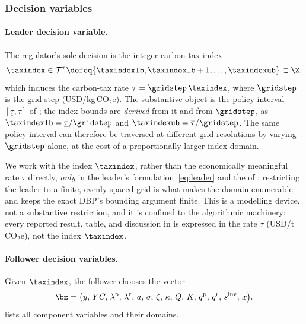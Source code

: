 \subsubsection{Decision variables}
\label{sec:model:variables}

\paragraph{Leader decision variable.}
The regulator's sole decision is the integer carbon-tax index
\begin{equation}
\taxindex\in\mathcal{T}^{\tau}\defeq
\{\taxindexlb,\taxindexlb+1,\ldots,\taxindexub\}\subset\Z,
\label{eq:leader_domain}
\end{equation}
which induces the carbon-tax rate $\tau=\gridstep\,\taxindex$, where
$\gridstep$ is the grid step (USD/kg\,CO$_2$e). The substantive object
is the policy interval $[\underline{\tau},\overline{\tau}]$ of
; the index bounds are \emph{derived} from it
and from $\gridstep$, as
$\taxindexlb=\underline{\tau}/\gridstep$ and
$\taxindexub=\overline{\tau}/\gridstep$. The same policy interval can
therefore be traversed at different grid resolutions by varying
$\gridstep$ alone, at the cost of a proportionally larger index domain.

We work with the index $\taxindex$, rather than the economically
meaningful rate $\tau$ directly, \emph{only} in the leader's
formulation~\eqref{eq:leader} and the \DBP of :
restricting the leader to a finite, evenly spaced grid is what makes
the domain enumerable and keeps the exact DBP's bounding argument
finite. This is a modelling device, not a substantive restriction, and
it is confined to the algorithmic machinery: every reported result,
table, and discussion in  is
expressed in the rate $\tau$ (USD/t\,CO$_2$e), not the index
$\taxindex$.

\paragraph{Follower decision variables.}
Given $\taxindex$, the follower chooses the vector
\begin{equation*}
\bz=\bigl(y,\,YC,\,\lambda^{\mathrm{p}},\,\lambda^{\mathrm{r}},\,a,\,
\sigma,\,\zeta,\,\kappa,\,Q,\,K,\,q^{\mathrm{p}},\,q^{\mathrm{r}},\,
s^{\mathrm{inv}},\,x\bigr).
\end{equation*}
 lists all component variables and their domains.

